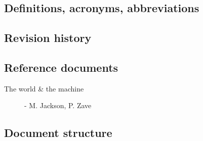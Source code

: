 \documentclass[../main.tex]{subfiles}
\begin{document}
%
%
%
%
%

\subsection{Definitions, acronyms, abbreviations}
\subsection{Revision history}
\subsection{Reference documents}

\begin{description}
	\item [The world \& the machine] - M. Jackson, P. Zave
\end{description}

\subsection{Document structure}
\end{document}
